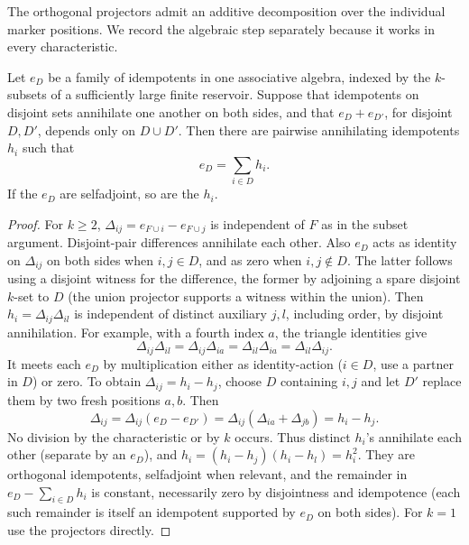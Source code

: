 The orthogonal projectors admit an additive decomposition over the individual marker positions.  We
record the algebraic step separately because it works in every characteristic.

\begin{lemma}\label{fa:projector-fold}
Let \(e_D\) be a family of idempotents in one associative algebra,
indexed by the \(k\)-subsets of a sufficiently large finite reservoir.
Suppose that idempotents on disjoint sets annihilate one another on both sides, and that
\(e_D+e_{D'}\), for disjoint \(D,D'\), depends only on \(D\cup D'\).  Then there are pairwise
annihilating idempotents \(h_i\) such that
\[
 e_D=\sum_{i\in D}h_i.
\]
If the \(e_D\) are selfadjoint, so are the \(h_i\).
\end{lemma}

\begin{proof}

For \(k\ge2\), \(\Delta_{ij}=e_{F\cup i}-e_{F\cup j}\) is independent of \(F\) as in the subset argument.
Disjoint-pair differences annihilate each other. Also \(e_D\) acts as identity on \(\Delta_{ij}\) on both
sides when \(i,j\in D\), and as zero when \(i,j\notin D\). The latter follows using a disjoint witness
for the difference, the former by adjoining a spare disjoint \(k\)-set to \(D\) (the union projector
supports a witness within the union). Then \(h_i=\Delta_{ij}\Delta_{il}\) is independent of distinct
auxiliary \(j,l\), including order, by disjoint annihilation.
For example, with a fourth index \(a\), the triangle identities give
\[
 \Delta_{ij}\Delta_{il}
 =\Delta_{ij}\Delta_{ia}
 =\Delta_{il}\Delta_{ia}
 =\Delta_{il}\Delta_{ij}.
\]
It meets each \(e_D\) by multiplication
either as identity-action (\(i\in D\), use a partner in \(D\)) or zero. To obtain
\(\Delta_{ij}=h_i-h_j\), choose \(D\) containing \(i,j\) and let \(D'\) replace them by two fresh
positions \(a,b\).  Then
\[
 \Delta_{ij}=\Delta_{ij}(e_D-e_{D'})
 =\Delta_{ij}(\Delta_{ia}+\Delta_{jb})=h_i-h_j.
\]
No division by the characteristic or by \(k\) occurs. Thus distinct \(h_i\)'s annihilate each other (separate by an \(e_D\)), and
\(h_i=(h_i-h_j)(h_i-h_l)=h_i^2\). They are orthogonal idempotents, selfadjoint when relevant, and the
remainder in \(e_D-\sum_{i\in D}h_i\) is constant, necessarily zero by disjointness and idempotence (each
such remainder is itself an idempotent supported by \(e_D\) on both sides). For \(k=1\) use the
projectors directly.

\end{proof}

